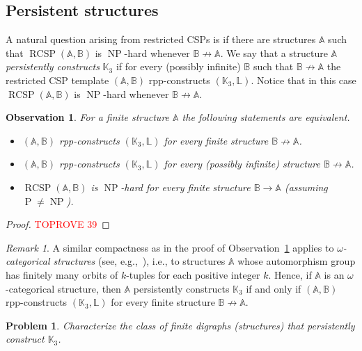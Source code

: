 \documentclass{article}
\newtheorem{observation}[theorem]{Observation}
\newtheorem{problem}[question]{Problem}
\theoremstyle{definition}
\theoremstyle{remark}
\newtheorem{remark}[theorem]{Remark}
\DeclareMathOperator{\NP}{NP}
\DeclareMathOperator{\cP}{P}
\DeclareMathOperator{\RCSP}{RCSP}
\newcommand{\bA}{{\mathbb A}}
\newcommand{\bB}{{\mathbb B}}
\newcommand{\bK}{{\mathbb K}}
\newcommand{\bL}{{\mathbb L}}
\begin{document}
\subsection*{Persistent structures}

A natural question arising from restricted CSPs is if there are structures $\bA$ such that
$\RCSP(\bA,\bB)$ is $\NP$-hard whenever $\bB\not\to \bA$. We say that a structure $\bA$
\emph{persistently constructs} $\bK_3$ if for every (possibly infinite) $\bB$ such
that $\bB\not\to\bA$ the restricted CSP template $(\bA,\bB)$ rpp-constructs $(\bK_3,\bL)$.
Notice that in this case $\RCSP(\bA,\bB)$ is $\NP$-hard whenever $\bB\not\to \bA$.

\begin{observation}\label{obs:persistent}
    For a finite structure $\bA$ the following statements are equivalent.
    \begin{itemize}
        \item $(\bA,\bB)$ rpp-constructs $(\bK_3,\bL)$ for every finite structure $\bB\not\to \bA$.
        \item $(\bA,\bB)$ rpp-constructs $(\bK_3,\bL)$ for every (possibly infinite) structure $\bB\not\to \bA$.
        \item $\RCSP(\bA,\bB)$ is $\NP$-hard for every finite structure $\bB\to \bA$ (assuming $\cP\neq \NP$).
    \end{itemize}
\end{observation}
\begin{proof}\textcolor{red}{TOPROVE 39}\end{proof}

\begin{remark}
    A similar compactness as in the proof of Observation~\ref{obs:persistent} applies to
    \emph{$\omega$-categorical structures} (see, e.g.,~\cite[Lemma 4.1.7]{Book}), i.e.,
    to structures $\bA$ whose automorphism group has finitely many orbits of $k$-tuples for
    each positive integer $k$. Hence, if $\bA$ is an $\omega$-categorical structure,
    then $\bA$ persistently constructs $\bK_3$ if and only if $(\bA,\bB)$ rpp-constructs
    $(\bK_3,\bL)$ for every finite structure $\bB\not\to \bA$.
\end{remark}




\begin{problem}
    Characterize the class of finite digraphs (structures) that persistently construct $\bK_3$.
\end{problem}
\end{document}
